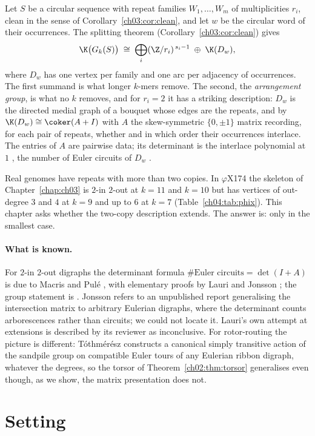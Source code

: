 Let $S$ be a circular sequence with repeat families $W_1,\dots,W_m$ of multiplicities
$r_i$, clean in the sense of Corollary~\ref{ch03:cor:clean}, and let $w$ be the circular word of their
occurrences. The splitting theorem (Corollary~\ref{ch03:cor:clean}) gives
\[
\K\bigl(G_k(S)\bigr)\;\cong\;\bigoplus_i(\Z/r_i)^{\,s_i-1}\;\oplus\;\K(D_w),
\]
where $D_w$ has one vertex per family and one arc per adjacency of occurrences. The
first summand is what longer $k$-mers remove. The second, the \emph{arrangement group},
is what no $k$ removes, and for $r_i=2$ it has a striking description: $D_w$ is the
directed medial graph of a bouquet whose edges are the repeats, and by
\cite[Thm.~7.3]{MMN} $\K(D_w)\cong\coker(A+I)$ with $A$ the skew-symmetric
$\{0,\pm1\}$ matrix recording, for each pair of repeats, whether and in which order
their occurrences interlace. The entries of $A$ are pairwise data; its determinant is the
interlace polynomial at $1$ \cite{ABS}, the number of Euler circuits of $D_w$
\cite{MacrisPule,Jonsson}.

Real genomes have repeats with more than two copies. In $\varphi$X174 the skeleton of
Chapter~\ref{chap:ch03} is $2$-in $2$-out at $k=11$ and $k=10$ but has vertices of out-degree $3$ and
$4$ at $k=9$ and up to $6$ at $k=7$ (Table~\ref{ch04:tab:phix}). This chapter asks whether the
two-copy description extends. The answer is: only in the smallest case.

\paragraph{What is known.} For $2$-in $2$-out digraphs the determinant formula
$\#\text{Euler circuits}=\det(I+A)$ is due to Macris and Pul\'e \cite{MacrisPule}, with
elementary proofs by Lauri and Jonsson \cite{Jonsson}; the group statement is
\cite{MMN}. Jonsson \cite[p.~192]{Jonsson} refers to an unpublished report generalising
the intersection matrix to arbitrary Eulerian digraphs, where the determinant counts
arborescences rather than circuits; we could not locate it. Lauri's own attempt at
extensions \cite{Lauri} is described by its reviewer as inconclusive. For rotor-routing
the picture is different: T\'othm\'er\'esz \cite{Toth} constructs a canonical simply
transitive action of the sandpile group on compatible Euler tours of any Eulerian ribbon
digraph, whatever the degrees, so the torsor of Theorem~\ref{ch02:thm:torsor} generalises even though, as
we show, the matrix presentation does not.

\section{Setting}\label{ch04:sec:setting}


